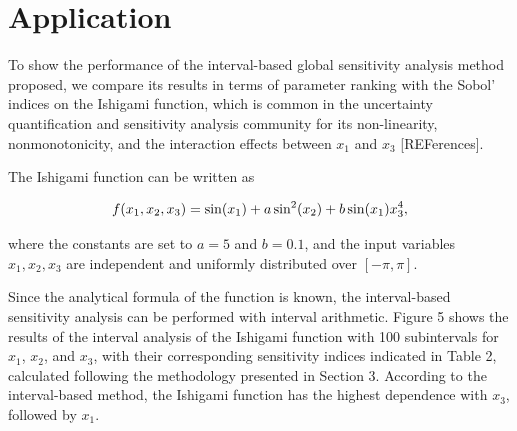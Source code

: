 \documentclass[twocolumn]{rps-esrel2022}
\begin{document}

\section{Application}

To show the performance of the interval-based global sensitivity analysis method proposed, we compare
its results in terms of parameter ranking with the Sobol' indices on the Ishigami function, which is common in the uncertainty quantification
and sensitivity analysis community for its non-linearity, nonmonotonicity, and the interaction effects between $x_1$ and $x_3$ [REFerences].

The Ishigami function can be written as

\begin{equation}
	\centering
	f(x_1,x_2,x_3) = \sin(x_1) + a\sin^2(x_2) + b\sin(x_1)x_3^4{,}
\end{equation}

where the constants are set to $a=5$ and $b=0.1$, and the input variables $x_1,x_2,x_3$ are independent and uniformly distributed
over $[-\pi,\pi]$.

Since the analytical formula of the function is known, the interval-based sensitivity analysis can be performed with interval
arithmetic.
Figure 5 shows the results of the interval analysis of the Ishigami function with 100 subintervals for $x_1$, $x_2$, and $x_3$, with their corresponding sensitivity
indices indicated in Table 2, calculated following the methodology presented in Section 3.
According to the interval-based method, the Ishigami function has the highest dependence with $x_3$, followed by $x_1$.
\end{document}

